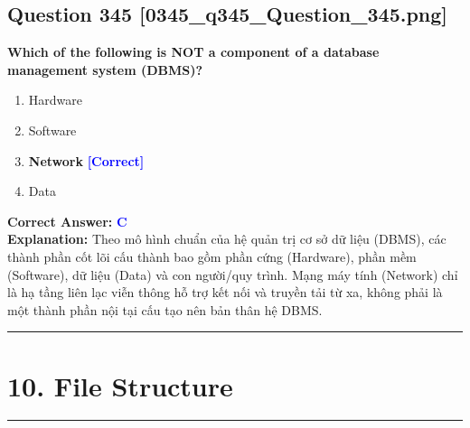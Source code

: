 \documentclass[11pt,a4paper]{article}
\begin{document}
\begin{minipage}{\textwidth}
\subsection*{Question 345 \quad \footnotesize{[0345\_q345\_Question\_345.png]}}
\noindent \textbf{Which of the following is NOT a component of a database management system (DBMS)?}

\begin{enumerate}[label=\Alph*.]
    \item Hardware
    \item Software
    \item \textbf{Network} \hfill \textcolor{blue}{\textbf{[Correct]}}
    \item Data
\end{enumerate}

\noindent \textbf{Correct Answer:} \textcolor{blue}{\textbf{C}} \\[2pt]
\noindent \textbf{Explanation:} Theo mô hình chuẩn của hệ quản trị cơ sở dữ liệu (DBMS), các thành phần cốt lõi cấu thành bao gồm phần cứng (Hardware), phần mềm (Software), dữ liệu (Data) và con người/quy trình. Mạng máy tính (Network) chỉ là hạ tầng liên lạc viễn thông hỗ trợ kết nối và truyền tải từ xa, không phải là một thành phần nội tại cấu tạo nên bản thân hệ DBMS.

\par\vspace{0.3cm}
\hrule
\vspace{0.3cm}
\end{minipage}


\newpage
\section*{10. File Structure}
\hrule\vspace{0.5cm}
\end{document}
